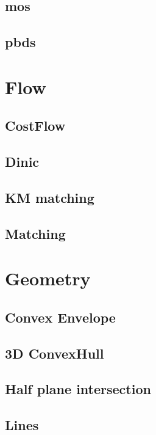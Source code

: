 \subsection{mos}

\subsection{pbds}


\section{Flow}
\subsection{CostFlow}

\subsection{Dinic}

\subsection{KM matching}

\subsection{Matching}


\section{Geometry}
\subsection{Convex Envelope}

\subsection{3D ConvexHull}

\subsection{Half plane intersection}

\subsection{Lines}

